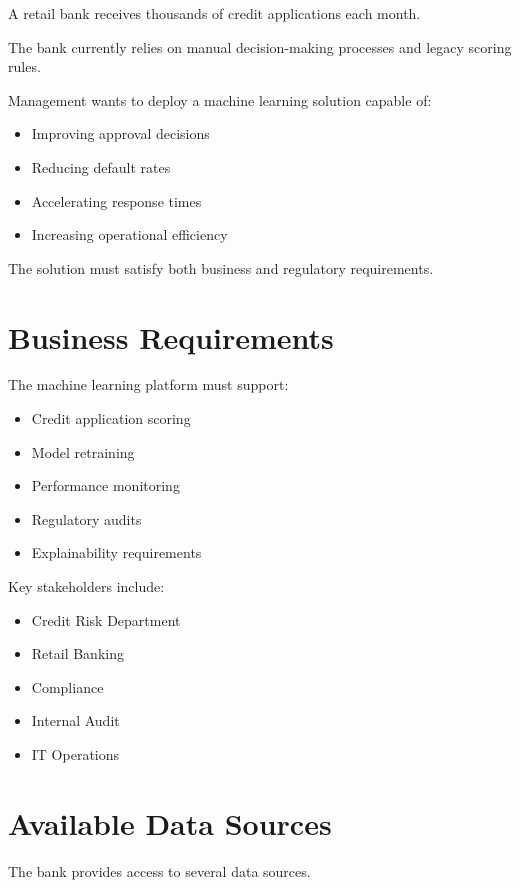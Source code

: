 A retail bank receives thousands of credit applications each month.

The bank currently relies on manual decision-making processes and legacy scoring rules.

Management wants to deploy a machine learning solution capable of:

\begin{itemize}
    \item Improving approval decisions
    \item Reducing default rates
    \item Accelerating response times
    \item Increasing operational efficiency
\end{itemize}

The solution must satisfy both business and regulatory requirements.

\section{Business Requirements}

The machine learning platform must support:

\begin{itemize}
    \item Credit application scoring
    \item Model retraining
    \item Performance monitoring
    \item Regulatory audits
    \item Explainability requirements
\end{itemize}

Key stakeholders include:

\begin{itemize}
    \item Credit Risk Department
    \item Retail Banking
    \item Compliance
    \item Internal Audit
    \item IT Operations
\end{itemize}

\section{Available Data Sources}

The bank provides access to several data sources.

